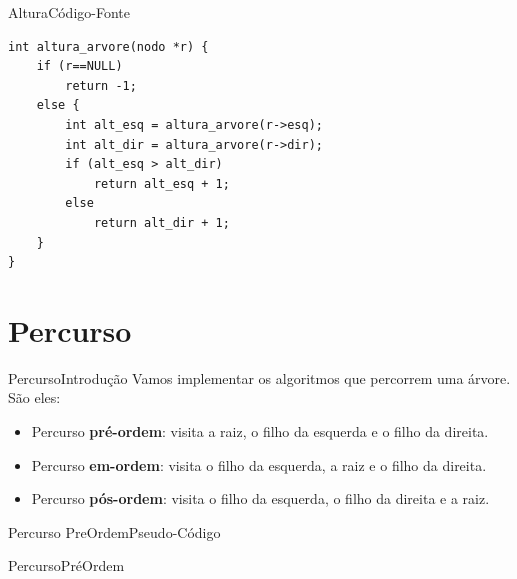 \documentclass[aspectratio=169]{beamer}
\begin{document}
\begin{frame}[fragile]{Altura}{Código-Fonte}
\begin{lstlisting}[style=CStyle,basicstyle=\small]
int altura_arvore(nodo *r) {
    if (r==NULL)
        return -1;
    else {
        int alt_esq = altura_arvore(r->esq);
        int alt_dir = altura_arvore(r->dir);
        if (alt_esq > alt_dir) 
            return alt_esq + 1;
        else
            return alt_dir + 1;
    }
}
\end{lstlisting}  
\end{frame}

\section{Percurso}

\begin{frame}{Percurso}{Introdução}
Vamos implementar os algoritmos que percorrem uma árvore. São eles:
 \begin{itemize}
 \item Percurso {\bf pré-ordem}: visita a raiz, o filho da esquerda e o filho da direita.
 \item Percurso {\bf em-ordem}: visita o filho da esquerda, a raiz e o filho da direita.
 \item Percurso {\bf pós-ordem}: visita o filho da esquerda, o filho da direita e a raiz.
 \end{itemize} 
\end{frame}


\begin{frame}{Percurso PreOrdem}{Pseudo-Código}
\begin{algorithm}[H]
\caption{PercursoPréOrdem} 
\label{PercursoPreOrdem}
\end{algorithm}
\end{frame}

\end{document}
